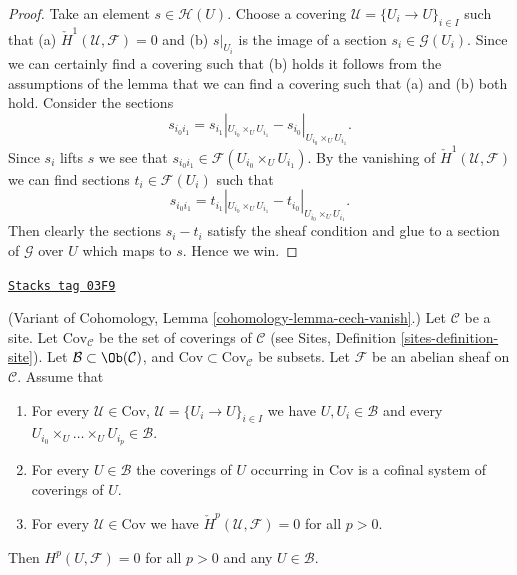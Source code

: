 \begin{proof}
Take an element $s \in \mathcal{H}(U)$. Choose a covering
$\mathcal{U} = \{U_i \to U\}_{i \in I}$ such that
(a) $\check{H}^1(\mathcal{U}, \mathcal{F}) = 0$ and (b)
$s|_{U_i}$ is the image of a section $s_i \in \mathcal{G}(U_i)$.
Since we can certainly find a covering such that (b) holds
it follows from the assumptions of the lemma that we can find
a covering such that (a) and (b) both hold.
Consider the sections
$$
s_{i_0i_1} =
s_{i_1}|_{U_{i_0} \times_U U_{i_1}} - s_{i_0}|_{U_{i_0} \times_U U_{i_1}}.
$$
Since $s_i$ lifts $s$ we see that
$s_{i_0i_1} \in \mathcal{F}(U_{i_0} \times_U U_{i_1})$.
By the vanishing of $\check{H}^1(\mathcal{U}, \mathcal{F})$ we can
find sections $t_i \in \mathcal{F}(U_i)$ such that
$$
s_{i_0i_1} =
t_{i_1}|_{U_{i_0} \times_U U_{i_1}} - t_{i_0}|_{U_{i_0} \times_U U_{i_1}}.
$$
Then clearly the sections $s_i - t_i$ satisfy the sheaf condition
and glue to a section of $\mathcal{G}$ over $U$ which maps to $s$.
Hence we win.
\end{proof}

\begin{lemma}
\label{sites-cohomology-lemma-cech-vanish-collection}
\href{https://stacks.math.columbia.edu/tag/03F9}{\texttt{Stacks tag 03F9}}

(Variant of Cohomology, Lemma \ref{cohomology-lemma-cech-vanish}.)
Let $\mathcal{C}$ be a site. Let $\text{Cov}_\mathcal{C}$ be the set
of coverings of $\mathcal{C}$ (see
Sites, Definition \ref{sites-definition-site}). Let
$\mathcal{B} \subset \Ob(\mathcal{C})$, and
$\text{Cov} \subset \text{Cov}_\mathcal{C}$
be subsets. Let $\mathcal{F}$ be an abelian sheaf on $\mathcal{C}$.
Assume that
\begin{enumerate}
\item For every $\mathcal{U} \in \text{Cov}$,
$\mathcal{U} = \{U_i \to U\}_{i \in I}$ we have
$U, U_i \in \mathcal{B}$ and every
$U_{i_0} \times_U \ldots \times_U U_{i_p} \in \mathcal{B}$.
\item For every $U \in \mathcal{B}$ the coverings of $U$
occurring in $\text{Cov}$ is a cofinal system of coverings of $U$.
\item For every $\mathcal{U} \in \text{Cov}$ we have
$\check{H}^p(\mathcal{U}, \mathcal{F}) = 0$ for all $p > 0$.
\end{enumerate}
Then $H^p(U, \mathcal{F}) = 0$ for all $p > 0$ and any $U \in \mathcal{B}$.
\end{lemma}

